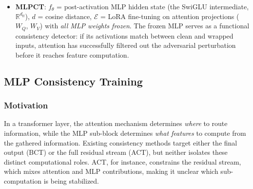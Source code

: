

\begin{itemize}
    \item \textbf{MLPCT}: $f_\theta$ = post-activation MLP hidden state (the SwiGLU intermediate, $\mathbb{R}^{d_{\text{ff}}}$), $d$ = cosine distance, $\mathcal{E}$ = LoRA fine-tuning on attention projections ($W_Q$, $W_V$) with \emph{all MLP weights frozen}. The frozen MLP serves as a functional consistency detector: if its activations match between clean and wrapped inputs, attention has successfully filtered out the adversarial perturbation before it reaches feature computation.
\end{itemize}



\subsection{MLP Consistency Training}
\label{sec:mlpct}

\subsubsection{Motivation}

In a transformer layer, the attention mechanism determines \emph{where} to route information, while the MLP sub-block determines \emph{what features} to compute from the gathered information. Existing consistency methods target either the final output (BCT) or the full residual stream (ACT), but neither isolates these distinct computational roles. ACT, for instance, constrains the residual stream, which mixes attention and MLP contributions, making it unclear which sub-computation is being stabilized.

